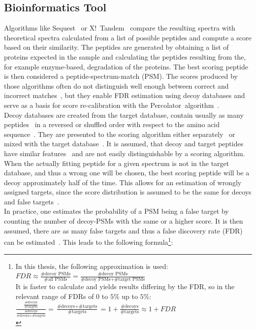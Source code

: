	\subsection{Bioinformatics Tool}
	\label{lab:background:bioinfo_tools}
	Algorithms like Sequest~\cite{Eng1994} or X!~Tandem~\cite{Craig2004} compare the resulting spectra with theoretical spectra calculated from a list of possible peptides and compute a score based on their similarity. The peptides are generated by obtaining a list of proteins expected in the sample and calculating the peptides resulting from the, for example enzyme-based, degradation of the proteins. The best scoring peptide is then considered a peptide-spectrum-match (PSM). The scores produced by those algorithms often do not distinguish well enough between correct and incorrect matches~\cite{Kll2007}, but they enable FDR estimation using decoy databases and serve as a basis for score re-calibration with the Percolator~algorithm~\cite{Kll2007, Granholm2012}.\\
	Decoy databases are created from the target database, contain usually as  many peptides~\cite{Peng2003, Moore2002} in a reversed or shuffled order with respect to the amino acid sequence~\cite{Aggarwal2016}. They are presented to the scoring algorithm either separately~\cite{Granholm2012} or mixed with the target database~\cite{Peng2003}. It is assumed, that decoy and target peptides have similar features~\cite{Moore2002} and are not easily distinguishable by a scoring algorithm. When the actually fitting peptide for a given spectrum is not in the target database, and thus a wrong one will be chosen, the best scoring peptide will be a decoy approximately half of the time. This allows for an estimation of wrongly assigned targets, since the score distribution is assumed to be the same for decoys and false targets~\cite{Aggarwal2016}.\\
	In practice, one estimates the probability of a PSM being a false target by counting the number of decoy-PSMs with the same or a higher score. It is then assumed, there are as many false targets and thus a false discovery rate (FDR) can be estimated~\cite{Granholm2012}. This leads to the following formula\footnote{In this thesis, the following approximation is used:\\
		$FDR \approx \frac{\text{\# decoy PSMs}}{\text{\# all PSMs}} = \frac{\text{\# decoy PSMs}}{\text{\# decoy PSMs} + \text{\# target PSMs}}$\\
		It is faster to calculate and yields results differing by the FDR, so in the relevant range of FDRs of $0$ to $5\%$ up to $5\%$:\\
		$\frac{\frac{\text{\# decoys}}{\text{\# targets}}}{\frac{\text{\# decoys}}{\text{\# decoys} + \text{\# targets}}} = \frac{\text{\# decoys} + \text{\# targets}}{\text{\# targets}} = 1 + \frac{\text{\# decoys}}{\text{\# targets}} \approx 1 + FDR$\\}:
